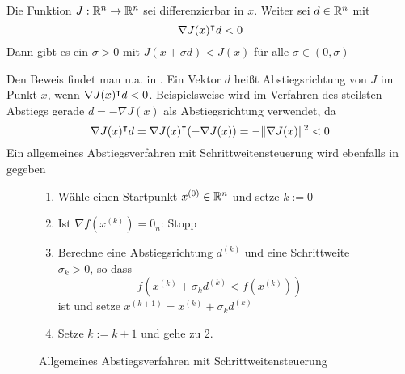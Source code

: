 
\begin{lemma}
\label{lem:optstepsize}
 Die Funktion $J:\mathbb{R}^n\to \mathbb{R}^n$ sei differenzierbar in $x$. Weiter sei $d\in \mathbb{R}^n$ mit 
 \[
  \nabla J(x)^\intercal d<0
 \]
 Dann gibt es ein $\bar \sigma>0$ mit $J(x+\bar \sigma d)< J(x)$ für alle $\sigma \in (0,\bar \sigma)$
\end{lemma}
Den Beweis findet man u.a. in \cite[vgl. Satz 4.1.1]{alt2002nichtlineare}. Ein Vektor $d$ heißt Abstiegsrichtung von $J$ im Punkt $x$, wenn $\nabla J(x)^\intercal d<0$. Beispielsweise wird im Verfahren des steilsten Abstiegs gerade $d=- \nabla J(x)$ als Abstiegsrichtung verwendet, da 
\[
\nabla J(x)^\intercal d = \nabla J(x)^\intercal (-\nabla J(x)) = - \|\nabla J(x)\|^2 <0                                                                                                                                                                                                                                                                        \]
Ein allgemeines Abstiegsverfahren mit Schrittweitensteuerung wird ebenfalls in \cite[S. 69, Verfahren 4.1.4]{alt2002nichtlineare} gegeben
\begin{figure}[H]
 \begin{enumerate}
  \item Wähle einen Startpunkt $x^{(0)}\in \mathbb{R}^n$ und setze $k:=0$
  \item Ist $\nabla f(x^{(k)})=0_n$: Stopp
  \item Berechne eine Abstiegsrichtung $d^{(k)}$ und eine Schrittweite $\sigma_k>0$, so dass
  \[
   f(x^{(k)} + \sigma_k d^{(k)} < f(x^{(k)}))
  \]
  ist und setze $x^{(k+1)} = x^{(k)}+\sigma_k d^{(k)}$
  \item Setze $k:=k+1$ und gehe zu 2.
 \end{enumerate}
\caption{Allgemeines Abstiegsverfahren mit Schrittweitensteuerung}
\label{alg:genSteepestDescent}
\end{figure}
